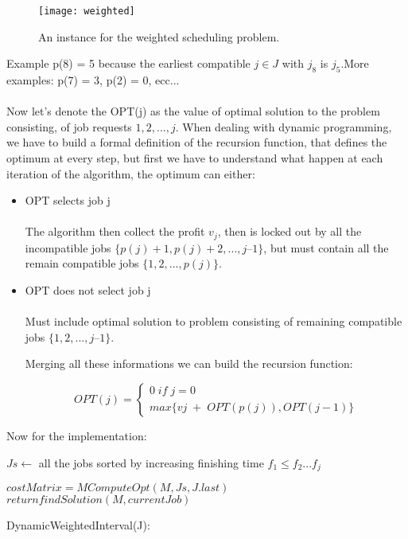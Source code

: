 \begin{figure}[H]
    \centering
    \texttt{[image: weighted]}
    \caption{An instance for the weighted scheduling problem.}
\end{figure}

Example p(8) = 5 because the earliest compatible $j \in J$ with $j_{8}$ is $j_{5}$.More examples: p(7) = 3, p(2) = 0, ecc...\\\\
Now let's denote the OPT(j) as the value of optimal solution to the problem consisting, of job requests $1, 2, ..., j$. When dealing with dynamic programming, we have to build a formal definition of the recursion function, that defines the optimum at every step, but first we have to understand what happen at each iteration of the algorithm, the optimum can either:

\begin{itemize}

    \item {OPT selects job j}\\\\
          The algorithm then collect the profit $v_{j}$, then is locked out by all the incompatible jobs $\{ p(j) + 1, p(j) + 2, ..., j – 1 \}$, but must contain all the remain compatible jobs $\{1, 2, ..., p(j)\}$.

    \item {OPT does not select job j}\\\\
          Must include optimal solution to problem consisting of remaining compatible jobs $\{1, 2, ..., j – 1\}$.

          Merging all these informations we can build the recursion function:

          \[OPT(j) = \begin{cases} 0 \; if \; j = 0 \\ max\{vj \; + \; OPT(p(j)), OPT(j−1)\}  \end{cases}\]

\end{itemize}

Now for the implementation:

\begin{algorithm}[H]
    \SetAlgoLined
    \small
    \BlankLine

    $Js \leftarrow$ all the jobs sorted by increasing finishing time $f_{1} \leq f_{2} ... f_{j}$

    \BlankLine


    \BlankLine

    $costMatrix = MComputeOpt(M,Js,J.last)$\;
    $return findSolution(M,currentJob)$

    \caption{DynamicWeightedInterval(J):}
\end{algorithm}

